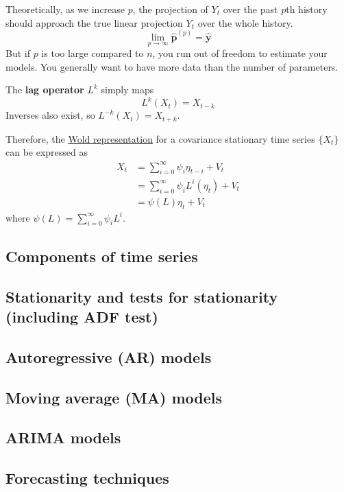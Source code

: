 \documentclass{article}
\begin{document}
  Theoretically, as we increase $p$, the projection of $Y_t$ over the past $p$th history should approach the true linear projection $Y_t$ over the whole history. 
  \begin{equation}
    \lim_{p \rightarrow \infty} \hat{\mathbf{p}}^{(p)} = \hat{\mathbf{y}}
  \end{equation}
  But if $p$ is too large compared to $n$, you run out of freedom to estimate your models. You generally want to have more data than the number of parameters. 

  \begin{definition}
    \label{def:lag-operator}
    The \textbf{lag operator} $L^k$ simply maps 
    \begin{equation}
      L^k (X_t)= X_{t-k}
    \end{equation}
    Inverses also exist, so $L^{-k} (X_t) = X_{t+k}$. 
  \end{definition}

  Therefore, the \hyperref[thm:wold-representation-theorem]{Wold representation} for a covariance stationary time series $\{X_t\}$ can be expressed as 
  \begin{align}
    X_t & = \sum_{i=0}^\infty \psi_i \eta_{t-i} + V_t \\
        & = \sum_{i=0}^\infty \psi_i L^i (\eta_{t}) + V_t \\
        & = \psi(L) \eta_t + V_t 
  \end{align}
  where $\psi(L) = \sum_{i=0}^\infty \psi_i L^i$. 

\subsection{Components of time series}

\subsection{Stationarity and tests for stationarity (including ADF test)}

\subsection{Autoregressive (AR) models}

\subsection{Moving average (MA) models}

\subsection{ARIMA models}

\subsection{Forecasting techniques}




\end{document}
